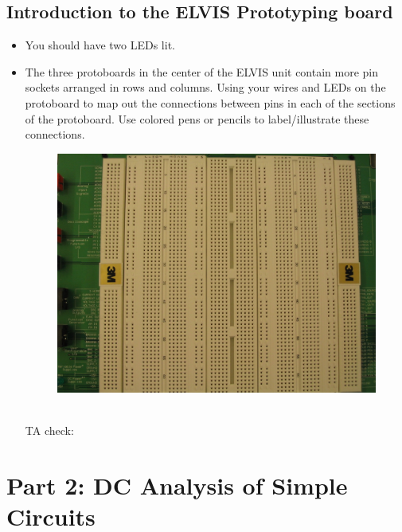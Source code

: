 \documentclass{article}
\begin{document}
\subsection*{Introduction to the ELVIS Prototyping board}
\begin{itemize}
	\item You should have two LEDs lit.
	\item The three protoboards in the center of the ELVIS unit contain more pin sockets arranged in rows and columns. Using your wires and LEDs on the protoboard to map out the connections between pins in each of the sections of the protoboard. Use colored pens or pencils to label/illustrate these connections.
	\vspace{1cm}
		\begin{figure}[h]
    	\includegraphics[width=\textwidth]{lab_1_fig_9.jpg}
    	\centering
		\end{figure}\\TA check: \underline{\hspace{2cm}}
\end{itemize}
\pagebreak

\section*{Part 2: DC Analysis of Simple Circuits}
\end{document}
